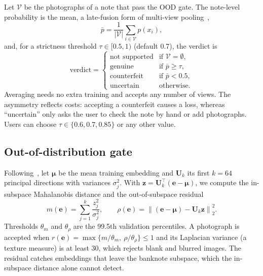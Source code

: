 \documentclass[pdflatex,iicol,sn-mathphys-num]{sn-jnl}
\begin{document}
Let $\mathcal{V}$ be the photographs of a note that pass the OOD gate. The note-level
probability is the mean, a late-fusion form of multi-view pooling~\cite{su2015mvcnn},
\begin{equation}
\bar{p} = \frac{1}{|\mathcal{V}|}\sum_{i\in\mathcal{V}} p(x_i),
\label{eq:fusion}
\end{equation}
and, for a strictness threshold $\tau\in[0.5,1)$ (default 0.7), the verdict is
\begin{equation}
\text{verdict} =
\begin{cases}
\text{not supported} & \text{if } \mathcal{V}=\emptyset,\\
\text{genuine} & \text{if } \bar{p}\ge\tau,\\
\text{counterfeit} & \text{if } \bar{p}<0.5,\\
\text{uncertain} & \text{otherwise.}
\end{cases}
\label{eq:decision}
\end{equation}
Averaging needs no extra training and accepts any number of views. The asymmetry
reflects costs: accepting a counterfeit causes a loss, whereas ``uncertain'' only asks
the user to check the note by hand or add photographs. Users can choose
$\tau\in\{0.6,0.7,0.85\}$ or any other value.

\subsection{Out-of-distribution gate}\label{sec:ood}

Following~\cite{lee2018mahalanobis}, let $\boldsymbol{\mu}$ be the mean training
embedding and $\mathbf{U}_k$ its first $k=64$ principal directions with variances
$\sigma_j^2$. With $\mathbf{z}=\mathbf{U}_k^{\top}(\mathbf{e}-\boldsymbol{\mu})$, we
compute the in-subspace Mahalanobis distance and the out-of-subspace residual
\begin{equation}
m(\mathbf{e}) = \sum_{j=1}^{k}\frac{z_j^2}{\sigma_j^2},\qquad
\rho(\mathbf{e}) = \left\lVert(\mathbf{e}-\boldsymbol{\mu})-\mathbf{U}_k\mathbf{z}\right\rVert_2^2 .
\label{eq:ood}
\end{equation}
Thresholds $\theta_m$ and $\theta_\rho$ are the 99.5th validation percentiles. A
photograph is accepted when $r(\mathbf{e})=\max\{m/\theta_m,\ \rho/\theta_\rho\}\le1$
and its Laplacian variance (a texture measure) is at least 30, which rejects blank and
blurred images. The residual catches embeddings that leave the banknote subspace, which
the in-subspace distance alone cannot detect.
\end{document}
